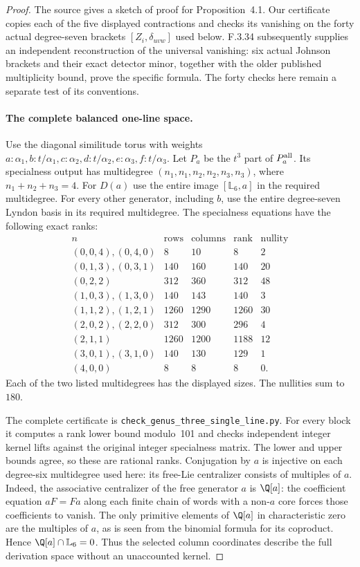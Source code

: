 \begin{proof}
The source gives a sketch of proof for Proposition~4.1. Our certificate
copies each of the five displayed contractions and checks its
vanishing on the forty actual degree-seven brackets
$[Z_i,\delta_{uvw}]$ used below. F.3.34 subsequently supplies an
independent reconstruction of the universal vanishing: six actual
Johnson brackets and their exact detector minor, together with the
older published multiplicity bound, prove the specific formula.
The forty checks here remain a separate test of its conventions.

\paragraph{The complete balanced one-line space.}
Use the diagonal similitude torus with weights
$a:\alpha_1,b:t/\alpha_1,c:\alpha_2,d:t/\alpha_2,
e:\alpha_3,f:t/\alpha_3$. Let $P_a$ be the $t^3$ part of
$P_a^{\rm all}$. Its specialness output has multidegree
$(n_1,n_1,n_2,n_2,n_3,n_3)$, where $n_1+n_2+n_3=4$.
For $D(a)$ use the entire image $[\mathbb L_6,a]$ in the
required multidegree. For every other generator, including $b$,
use the entire degree-seven Lyndon basis in its required multidegree.
The specialness equations have the following exact ranks:
\[
\begin{array}{c|r|r|r|r}
n&\text{rows}&\text{columns}&\text{rank}&\text{nullity}\\\hline
(0,0,4),(0,4,0)&8&10&8&2\\
(0,1,3),(0,3,1)&140&160&140&20\\
(0,2,2)&312&360&312&48\\
(1,0,3),(1,3,0)&140&143&140&3\\
(1,1,2),(1,2,1)&1260&1290&1260&30\\
(2,0,2),(2,2,0)&312&300&296&4\\
(2,1,1)&1260&1200&1188&12\\
(3,0,1),(3,1,0)&140&130&129&1\\
(4,0,0)&8&8&8&0.
\end{array}                                                   \tag{SL.5}
\]
Each of the two listed multidegrees has the displayed sizes.
The nullities sum to $180$.

The complete certificate is
\texttt{check\_genus\_three\_}\allowbreak\texttt{single\_line.py}.
For every block it computes a rank lower bound modulo~101 and
checks independent integer kernel lifts against the original
integer specialness matrix. The lower and upper bounds agree,
so these are rational ranks. Conjugation by $a$ is injective on
each degree-six multidegree used here: its free-Lie centralizer
consists of multiples of $a$. Indeed, the associative centralizer
of the free generator $a$ is $\Q[a]$: the coefficient equation
$aF=Fa$ along each finite chain of words with a non-$a$ core
forces those coefficients to vanish. The only primitive elements
of $\Q[a]$ in characteristic zero are the multiples of $a$,
as is seen from the binomial formula for its coproduct.
Hence $\Q[a]\cap\mathbb L_6=0$. Thus the selected column coordinates
describe the full derivation space without an unaccounted kernel.


\end{proof}
